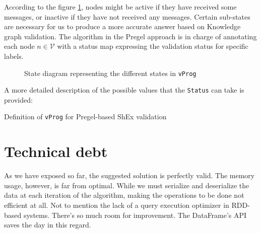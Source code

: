 According to the figure \ref{fig:state:pregel}, nodes might be active if they have received some messages, or inactive if they have not received any messages. Certain sub-states are necessary for us to produce a more accurate answer based on Knowledge graph validation. The algorithm in the Pregel approach is in charge of annotating each node $n\in\mathcal{V}$ with a status map expressing the validation status for specific labels.

\begin{figure}[H]
    \centering
    
    \caption[State diagram representing the different states in \texttt{vProg}]{State diagram representing the different states in \texttt{vProg}~\cite{https://doi.org/10.48550/arxiv.2110.11709}}
    \label{fig:state:pregel}
\end{figure}

A more detailed description of the possible values that the \texttt{Status} can take is provided:

\begin{center}
    
\end{center}

\begin{pseudocode}
    
\end{pseudocode}

\begin{table}
    \centering
    
    \label{vProg}
    \caption{Definition of \texttt{vProg} for Pregel-based ShEx validation}
\end{table}
\section{Technical debt}

As we have exposed so far, the suggested solution is perfectly valid. The memory usage, however, is far from optimal. While we must serialize and deserialize the data at each iteration of the algorithm, making the operations to be done not efficient at all. Not to mention the lack of a query execution optimizer in RDD-based systems. There's so much room for improvement. The DataFrame's API saves the day in this regard.
